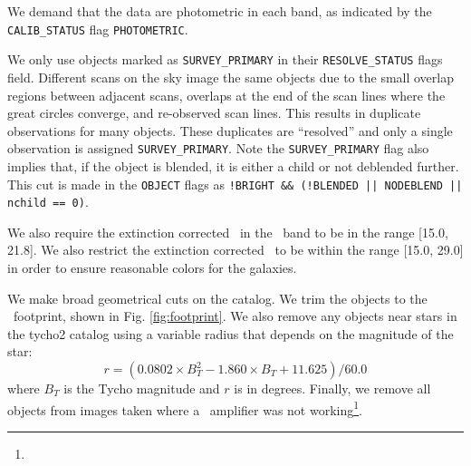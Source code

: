 \documentclass[12pt,preprint]{aastex}
\newcommand{\modelrmin}{15.0}
\newcommand{\modelrmax}{29.0}
\newcommand{\rmin}{15.0}
\newcommand{\rmax}{21.8}
\begin{document}

We demand that the data are photometric in each band, as indicated by
the \texttt{CALIB\_STATUS} flag \texttt{PHOTOMETRIC}.

We only use objects marked as \texttt{SURVEY\_PRIMARY} in their
\texttt{RESOLVE\_STATUS} flags field. Different scans on the sky image the same
objects due to the small overlap regions between adjacent scans, overlaps at
the end of the scan lines where the great circles converge, and re-observed
scan lines.  This results in duplicate observations for many objects.  These
duplicates are ``resolved'' and only a single observation is assigned
\texttt{SURVEY\_PRIMARY}.  Note the \texttt{SURVEY\_PRIMARY} flag also implies
that, if the object is blended, it is either a child or not deblended further.
This cut is made in the \texttt{OBJECT} flags as \texttt{!BRIGHT \&\& (!BLENDED
|| NODEBLEND || nchild == 0)}.

We also require the extinction corrected \citep{Schlegel98} \cmodelmag\ in the
\rmag\ band to be in the range [\rmin, \rmax].   We also restrict the
extinction corrected \modelmag\ to be within the range [\modelrmin, \modelrmax]
in order to ensure reasonable colors for the galaxies.


We make broad geometrical cuts on the catalog.  We trim the objects to the
\boss\ footprint, shown in Fig. \ref{fig:footprint}. We also remove any
objects near stars in the tycho2 catalog \citep{tycho2} using a variable radius
that depends on the magnitude of the star:
\begin{equation}
r = (0.0802\times B_T^2 - 1.860\times B_T + 11.625)/60.0
\end{equation}
where $B_T$ is the Tycho magnitude and $r$ is in degrees\citep{blanton05a}.
Finally, we remove all objects from images taken where a \umag\ amplifier was
not working\footnote{\DRsevcaveat}.
\end{document}
